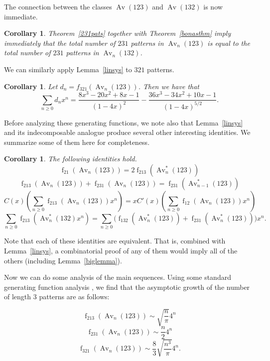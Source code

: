 \documentclass[11pt]{article} %
\theoremstyle{plain}
\newtheorem{corollary}[theorem]{Corollary}
\theoremstyle{definition}
\newcommand{\Avns}{\Av_n^*(123)}
\newcommand{\Avn}{\Av_n(123)}
\DeclareMathOperator{\Av}{Av}
\DeclareMathOperator{\num}{f}
\begin{document}
  The connection between the classes $\Av(123)$ and $\Av(132)$ is now
  immediate.

  \begin{corollary} \label{bridge}
    Theorem~\ref{231pats} together with Theorem~\ref{bonasthm}
    imply immediately that the  total number of $231$ patterns in
    $\Av_n (123)$ is equal to the total number of $231$ patterns in
    $\Av_n (132)$.
  \end{corollary}

  We can similarly apply Lemma~\ref{linsys} to $321$ patterns.
  \begin{corollary}
    Let $d_n = f_{321}(\Avn)$. Then we have that
    $$
      \sum_{n\geq 0} d_n x^n =
      \frac{ 8x^3 - 20x^2 + 8x - 1}{(1-4x)^{2}}
      - \frac{36x^3 - 34x^2 + 10x - 1}{(1-4x)^{5/2}}.
    $$
  \end{corollary}

  Before analyzing these generating functions, we note also that
  Lemma~\ref{linsys} and its indecomposable analogue produce several other
  interesting identities. We summarize some of them here for completeness.

  \begin{corollary}
    The following identities hold.
    $$ \num_{21}(\Avn) = 2\num_{213}(\Avns) $$
    $$ \num_{213}(\Avn) + \num_{231}(\Avn) = \num_{231} (\Av
    _{n-1}^*(123))$$
    $$ C(x) \left(\sum_{n\geq 0} \num_{213}(\Avn) x^n \right) =
      x C'(x) \left(\sum_{n \geq 0} \num_{12}(\Avn)x^n \right) $$
    $$ \sum_{n\geq 0} \num_{213} (\Av_n^* (132)  x^n) =
      \sum_{n \geq 0} \big(\num_{132}(\Avns) +
      \num_{231}(\Avns)\big)x^n. $$

  \end{corollary}

  Note that each of these identities are equivalent. That is, combined
  with Lemma~\ref{linsys}, a combinatorial proof of any of them would
  imply all of the others (including Lemma~\ref{biglemma}).

  Now we can do some analysis of the main sequences. Using some
  standard generating function analysis \cite{flajolet}, we find
  that the asymptotic growth of the number of length $3$ patterns are
  as follows:

  \vspace{1pc}

  $$ \num_{213} (\Avn) \sim \sqrt{\frac{n}{\pi}} 4^n$$
  $$ \num_{231} (\Avn) \sim \frac{n}{2} 4^n $$
  $$ \num_{321} (\Avn) \sim \frac{8}{3} \sqrt{\frac{n^3}{\pi}} 4^n. $$
\end{document}
